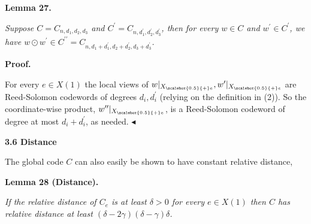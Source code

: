 \documentclass[10pt,a4paper]{article}
\begin{document}


\par\medskip\noindent\textbf{
\textbf{Lemma 27}\textbf{.}
}\par



\emph{Suppose $C=C_{n,d_{1},d_{2},d_{3}}$ and $C^{\prime}=C_{n,d^{\prime}_{1},d^{\prime}_{2},d^{\prime}_{3}}$, then for every $w\in C$ and $w^{\prime}\in C^{\prime}$, we have $w\odot w^{\prime}\in C^{\prime\prime}=C_{n,d_{1}+d^{\prime}_{1},d_{2}+d^{\prime}_{2},d_{3}+d^{\prime}_{3}}$.}\par






\par\medskip\noindent\textbf{Proof.}\par




For every $e\in X(1)$ the local views of $w|_{{X}_{\scalebox{0.5}{+}e}},w^{\prime}|_{{X}_{\scalebox{0.5}{+}e}}$ are Reed-Solomon codewords of degrees $d_{i},d^{\prime}_{i}$ (relying on the definition in (2)). So the coordinate-wise product, $w^{\prime\prime}|_{{X}_{\scalebox{0.5}{+}e}}$, is a Reed-Solomon codeword of degree at most $d_{i}+d^{\prime}_{i}$, as needed.
$\blacktriangleleft$\par






\par\medskip\noindent\textbf{
3.6 Distance}\par




The global code $C$ can also easily be shown to have constant relative distance,\par





\par\medskip\noindent\textbf{
\textbf{Lemma 28}\textbf{ }(Distance)\textbf{.}
}\par



\emph{If the relative distance of $C_{e}$ is at least $\delta>0$ for every $e\in X(1)$ then $C$ has relative distance at least $(\delta-2\gamma)(\delta-\gamma)\delta$.}\par
\end{document}
